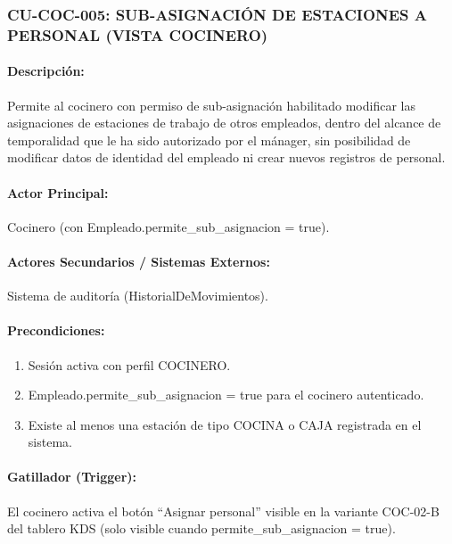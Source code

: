 \subsubsection{CU-COC-005: SUB-ASIGNACIÓN DE ESTACIONES A PERSONAL (VISTA COCINERO)}
\paragraph{Descripción:} Permite al cocinero con permiso de sub-asignación habilitado modificar las asignaciones de estaciones de trabajo de otros empleados, dentro del alcance de temporalidad que le ha sido autorizado por el mánager, sin posibilidad de modificar datos de identidad del empleado ni crear nuevos registros de personal.

\paragraph{Actor Principal:} Cocinero (con Empleado.permite\_sub\_asignacion = true).

\paragraph{Actores Secundarios / Sistemas Externos:} Sistema de auditoría (HistorialDeMovimientos).

\paragraph{Precondiciones:}
\begin{enumerate}
    \item[I.] Sesión activa con perfil COCINERO.
    \item[II.] Empleado.permite\_sub\_asignacion = true para el cocinero autenticado.
    \item[III.] Existe al menos una estación de tipo COCINA o CAJA registrada en el sistema.
\end{enumerate}

\paragraph{Gatillador (Trigger):} El cocinero activa el botón ``Asignar personal'' visible en la variante COC-02-B del tablero KDS (solo visible cuando permite\_sub\_asignacion = true).

